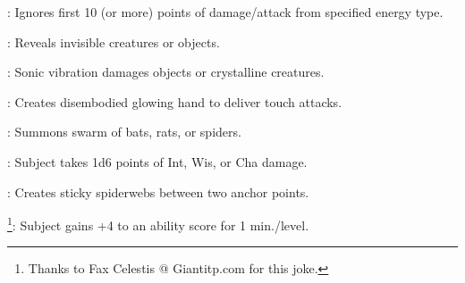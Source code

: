 \begin{list}{}{\leftmargin=1em}
\item {}: Ignores first 10 (or more) points of damage/attack from specified energy type.
\item {}: Reveals invisible creatures or objects.
\item {}: Sonic vibration damages objects or crystalline creatures.
\item {}: Creates disembodied glowing hand to deliver touch attacks.
\item {}: Summons swarm of bats, rats, or spiders.
\item {}: Subject takes 1d6 points of Int, Wis, or Cha damage.
\item {}: Creates sticky spiderwebs between two anchor points.
\item {}\footnote{Thanks to Fax Celestis @ Giantitp.com for this joke.}: Subject gains +4 to an ability score for 1 min./level.
\end{list}

